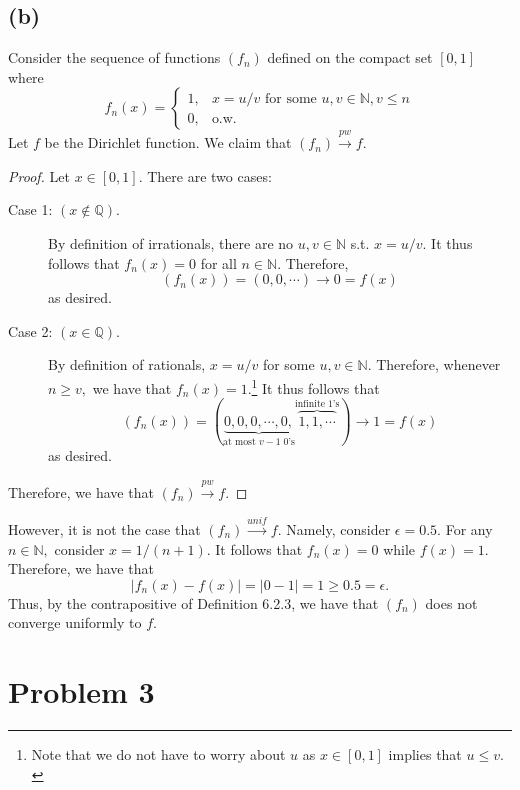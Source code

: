 \documentclass[10pt]{article}
\begin{document}
\subsection*{(b)}
Consider the sequence of functions $(f_n)$ defined on the compact set $[0,1]$ where
\begin{equation*}
    f_n(x) = \begin{cases}
        1,& x=u/v \text{ for some }u,v\in\mathbb{N}, v\le n\\
        0,&\text{o.w.}
    \end{cases}
\end{equation*}
Let $f$ be the Dirichlet function. We claim that $(f_n)\stackrel{pw}{\to}f.$
\begin{proof}
    Let $x\in[0,1].$ There are two cases:
    \begin{description}
        \item[Case 1: $(x\notin\mathbb{Q}).$] By definition of irrationals, there are no $u,v\in\mathbb{N}$ s.t. $x=u/v.$ It thus follows that $f_n(x)=0$ for all $n\in\mathbb{N}.$ Therefore,        
        \[(f_n(x))=(0,0,\cdots)\to 0 = f(x)\]
        as desired.
        \item[Case 2: $(x\in\mathbb{Q}).$] By definition of rationals, $x=u/v$ for some $u,v\in\mathbb{N}.$ Therefore, whenever $n\ge v,$ we have that $f_n(x)=1$.\footnote{Note that we do not have to worry about $u$ as $x\in[0,1]$ implies that $u\le v.$} It thus follows that
        \[(f_n(x))=(\underbrace{0,0,0,\cdots,0,}_{\text{at most }v-1\; 0\text{'s}}\overbrace{1,1,\cdots}^{\text{infinite}\;1\text{'s}})\to 1 = f(x)\]
        as desired.
    \end{description}
    Therefore, we have that $(f_n)\stackrel{pw}{\to}f.$
\end{proof}

However, it is not the case that $(f_n)\stackrel{unif}{\to}f.$ Namely, consider $\epsilon=0.5.$ For any $n\in\mathbb{N},$ consider $x=1/(n+1).$ It follows that $f_n(x)=0$ while $f(x)=1.$ Therefore, we have that
\[|f_n(x)-f(x)|=|0-1|=1\ge 0.5=\epsilon.\]
Thus, by the contrapositive of Definition 6.2.3, we have that $(f_n)$ does not converge uniformly to $f.$

\newpage
\section*{Problem 3}
\end{document}
